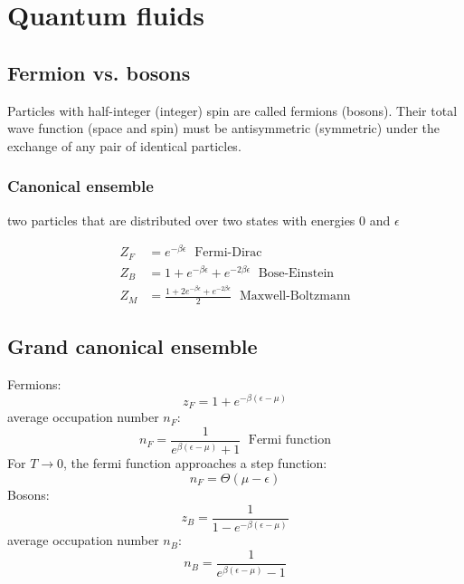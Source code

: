 \section{Quantum fluids}

\subsection*{Fermion vs. bosons}
Particles with half-integer (integer) spin are called fermions (bosons). Their
total wave function (space and spin) must be antisymmetric (symmetric)
under the exchange of any pair of identical particles.

\subsubsection*{Canonical ensemble}
two particles that are distributed over two states with energies 0 and $\epsilon$

\begin{equation*}
    \begin{aligned}
        Z_F &= e^{-\beta \epsilon} \; \text{ Fermi-Dirac} \\
        Z_B &= 1+ e^{-\beta \epsilon} + e^{-2\beta \epsilon} \; \text{ Bose-Einstein} \\
        Z_M &= \frac{1+ 2e^{-\beta \epsilon} + e^{-2\beta \epsilon}}{2} \; \text{ Maxwell-Boltzmann}
    \end{aligned}
\end{equation*}

\subsection*{Grand canonical ensemble}
Fermions:
\begin{equation*}
    z_F = 1+e^{-\beta(\epsilon-\mu)}
\end{equation*}
average occupation number $n_F$:
\begin{equation*}
    n_F = \frac{1}{e^{\beta(\epsilon - \mu)}+1} \; \text{ Fermi function}
\end{equation*}
For $T \rightarrow 0$, the fermi function approaches a step function:
\begin{equation*}
    n_F = \Theta (\mu - \epsilon)
\end{equation*}
Bosons:
\begin{equation*}
    z_B = \frac{1}{1-e^{-\beta(\epsilon-\mu)}}
\end{equation*}
average occupation number $n_B$:
\begin{equation*}
    n_B = \frac{1}{e^{\beta(\epsilon - \mu)}-1}
\end{equation*}

